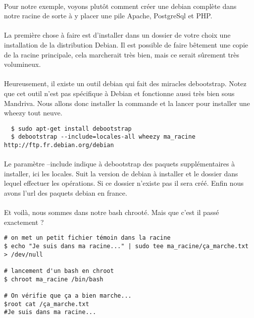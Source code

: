 \documentclass{article}
\begin{document}
\paragraph{}Pour notre exemple, voyons plutôt comment créer une debian complète dans notre racine de sorte à y placer une pile Apache, PostgreSql et PHP.

\paragraph{}La première chose à faire est d'installer dans un dossier de votre choix une installation de la distribution Debian. Il est possible de faire bêtement une copie de la racine principale, cela marcherait très bien, mais ce serait sûrement très volumineux.

\paragraph{}Heureusement, il existe un outil debian qui fait des miracles debootstrap. Notez que cet outil n'est pas spécifique à Debian et fonctionne aussi très bien sous Mandriva. Nous allons donc installer la commande et la lancer pour installer une wheezy tout neuve.

\begin{verbatim}
  $ sudo apt-get install debootstrap
  $ debootstrap --include=locales-all wheezy ma_racine http://ftp.fr.debian.org/debian
\end{verbatim}

\paragraph{}Le paramètre --include indique à debootstrap des paquets supplémentaires à installer, ici les locales. Suit la version de debian à installer et le dossier dans lequel effectuer les opérations. Si ce dossier n'existe pas il sera créé. Enfin nous avons l'url des paquets debian en france.

\paragraph{}Et voilà, nous sommes dans notre bash chrooté. Mais que c'est il passé exactement ?

\begin{verbatim}
# on met un petit fichier témoin dans la racine
$ echo "Je suis dans ma racine..." | sudo tee ma_racine/ça_marche.txt > /dev/null

# lancement d'un bash en chroot
$ chroot ma_racine /bin/bash

# On vérifie que ça a bien marche...
$root cat /ça_marche.txt
#Je suis dans ma racine...
\end{verbatim}
\end{document}
